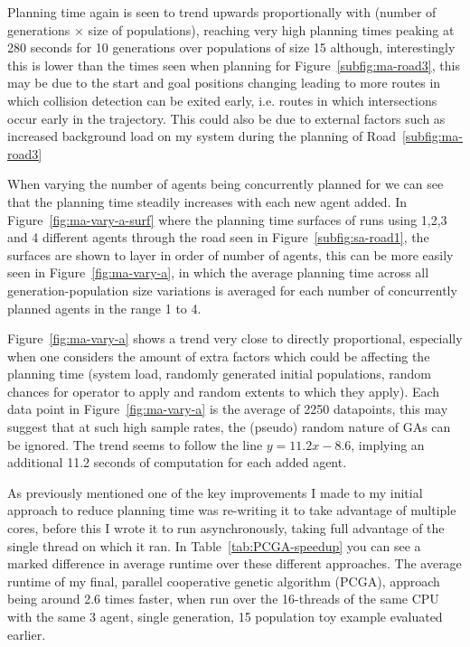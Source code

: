 Planning time again is seen to trend upwards proportionally with (number of generations $\times$ size of populations), reaching very high planning times peaking at 280 seconds for 10 generations over populations of size 15 although, interestingly this is lower than the times seen when planning for Figure~\ref{subfig:ma-road3}, this may be due to the start and goal positions changing leading to more routes in which collision detection can be exited early, i.e. routes in which intersections occur early in the trajectory. This could also be due to external factors such as increased background load on my system during the planning of Road~\ref{subfig:ma-road3}

When varying the number of agents being concurrently planned for we can see that the planning time steadily increases with each new agent added. In Figure~\ref{fig:ma-vary-a-surf} where the planning time surfaces of runs using 1,2,3 and 4 different agents through the road seen in Figure~\ref{subfig:sa-road1}, the surfaces are shown to layer in order of number of agents, this can be more easily seen in Figure~\ref{fig:ma-vary-a}, in which the average planning time across all generation-population size variations is averaged for each number of concurrently planned agents in the range 1 to 4.

Figure~\ref{fig:ma-vary-a} shows a trend very close to directly proportional, especially when one considers the amount of extra factors which could be affecting the planning time (system load, randomly generated initial populations, random chances for operator to apply and random extents to which they apply). Each data point in Figure~\ref{fig:ma-vary-a} is the average of 2250 datapoints, this may suggest that at such high sample rates, the (pseudo) random nature of GAs can be ignored. The trend seems to follow the line $y = 11.2x - 8.6$, implying an additional 11.2 seconds of computation for each added agent.

As previously mentioned one of the key improvements I made to my initial approach to reduce planning time was re-writing it to take advantage of multiple cores, before this I wrote it to run asynchronously, taking full advantage of the single thread on which it ran. In Table~\ref{tab:PCGA-speedup} you can see a marked difference in average runtime over these different approaches. The average runtime of my final, parallel cooperative genetic algorithm (PCGA), approach being around 2.6 times faster, when run over the 16-threads of the same CPU with the same 3 agent, single generation, 15 population toy example evaluated earlier.

